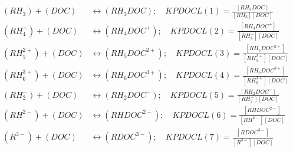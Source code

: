 \documentclass[fleqn, oneside, 11pt]{article}%
\begin{document}
\begin{preview}
\begin{align*}%
(RH_{3}) + (DOC) & \leftrightarrow (RH_{3}DOC); \quad KPDOCL(1)=\frac{[RH_{3}DOC]}{[RH_{3}][DOC]} \nonumber \\ 
(RH^{+}_{4}) + (DOC) & \leftrightarrow (RH_{4}DOC^{+}); \quad KPDOCL(2)=\frac{[RH_{4}DOC^{+}]}{[RH^{+}_{4}][DOC]} \nonumber \\ 
(RH^{2+}_{5}) + (DOC) & \leftrightarrow (RH_{5}DOC^{2+}); \quad KPDOCL(3)=\frac{[RH_{5}DOC^{2+}]}{[RH^{2+}_{5}][DOC]} \nonumber \\ 
(RH^{3+}_{6}) + (DOC) & \leftrightarrow (RH_{6}DOC^{3+}); \quad KPDOCL(4)=\frac{[RH_{6}DOC^{3+}]}{[RH^{3+}_{6}][DOC]} \nonumber \\ 
(RH^{-}_{2}) + (DOC) & \leftrightarrow (RH_{2}DOC^{-}); \quad KPDOCL(5)=\frac{[RH_{2}DOC^{-}]}{[RH^{-}_{2}][DOC]} \nonumber \\ 
(RH^{2-}) + (DOC) & \leftrightarrow (RHDOC^{2-}); \quad KPDOCL(6)=\frac{[RHDOC^{2-}]}{[RH^{2-}][DOC]} \nonumber \\ 
(R^{3-}) + (DOC) & \leftrightarrow (RDOC^{3-}); \quad KPDOCL(7)=\frac{[RDOC^{3-}]}{[R^{3-}][DOC]} \nonumber \\
\end{align*} 
\end{preview}
\end{document}
